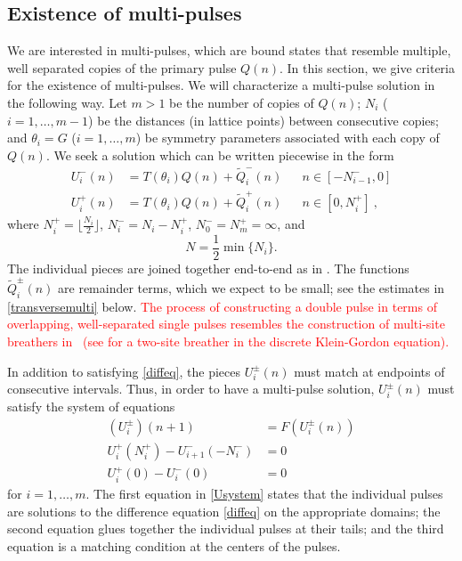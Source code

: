 \documentclass[12pt]{elsarticle}
\newcommand{\revised}[1]{ \textcolor{red}{#1} }
\begin{document}
\subsection{Existence of multi-pulses}

We are interested in multi-pulses, which are bound states that resemble multiple, well separated copies of the primary pulse $Q(n)$. In this section, we give criteria for the existence of multi-pulses. We will characterize a multi-pulse solution in the following way. Let $m > 1$ be the number of copies of $Q(n)$; $N_i$ ($i = 1, \dots, m-1$) be the distances (in lattice points) between consecutive copies; and $\theta_i = G$ ($i = 1, \dots, m$) be symmetry parameters associated with each copy of $Q(n)$. We seek a solution which can be written piecewise in the form 
\begin{equation}\label{Upiecewise}
\begin{aligned}
U_i^-(n) &= T(\theta_i) Q(n) + \tilde{Q}_i^-(n) && n \in [-N_{i-1}^-, 0] \\
U_i^+(n) &= T(\theta_i) Q(n) + \tilde{Q}_i^+(n) && n \in [0, N_i^+] \:,
\end{aligned}
\end{equation}
where $N_i^+ = \lfloor \frac{N_i}{2} \rfloor$, $N_i^- = N_i - N_i^+$, $N_0^- = N_m^+ = \infty$, and
\begin{equation}\label{defN}
N = \frac{1}{2} \min\{ N_i \}.
\end{equation}
The individual pieces are joined together end-to-end as in \cite{Sandstede1998}. The functions $\tilde{Q}_i^\pm(n)$ are remainder terms, which we expect to be small; see the estimates in \cref{transversemulti} below. \revised{The process of constructing a double pulse in terms of overlapping, well-separated single pulses resembles the construction of multi-site breathers in~\cite{Pelinovsky2012} (see \cite[Lemma 1]{Pelinovsky2012} for a two-site breather in the discrete Klein-Gordon equation).} 

In addition to satisfying \cref{diffeq}, the pieces $U_i^\pm(n)$ must match at endpoints of consecutive intervals. Thus, in order to have a multi-pulse solution, $U_i^\pm(n)$ must satisfy the system of equations
\begin{equation}\label{Usystem}
\begin{aligned}
(U_i^\pm)(n+1) &= F(U_i^\pm(n))  \\
U_i^+(N_i^+) - U_{i+1}^-(-N_i^-) &= 0 \\
U_i^+(0) - U_i^-(0) &= 0
\end{aligned}
\end{equation}
for $i = 1, \dots, m$. The first equation in \cref{Usystem} states that the individual pulses are solutions to the difference equation \cref{diffeq} on the appropriate domains; the second equation glues together the individual pulses at their tails; and the third equation is a matching condition at the centers of the pulses.
\end{document}
